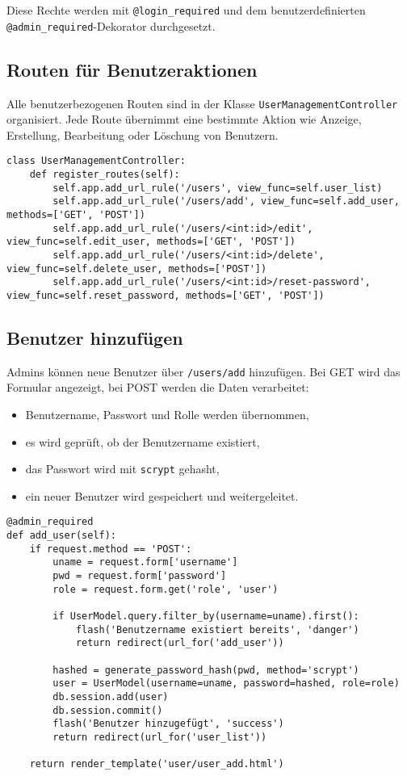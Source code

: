 \documentclass[12pt]{article}
\begin{document}
\noindent Diese Rechte werden mit \texttt{@login\_required} und dem benutzerdefinierten \texttt{@admin\_required}-Dekorator durchgesetzt.

\subsection*{Routen für Benutzeraktionen}

Alle benutzerbezogenen Routen sind in der Klasse \texttt{UserManagementController} organisiert. Jede Route übernimmt eine bestimmte Aktion wie Anzeige, Erstellung, Bearbeitung oder Löschung von Benutzern.

\begin{verbatim}
class UserManagementController:
    def register_routes(self):
        self.app.add_url_rule('/users', view_func=self.user_list)
        self.app.add_url_rule('/users/add', view_func=self.add_user, methods=['GET', 'POST'])
        self.app.add_url_rule('/users/<int:id>/edit', view_func=self.edit_user, methods=['GET', 'POST'])
        self.app.add_url_rule('/users/<int:id>/delete', view_func=self.delete_user, methods=['POST'])
        self.app.add_url_rule('/users/<int:id>/reset-password', view_func=self.reset_password, methods=['GET', 'POST'])
\end{verbatim}

\subsection*{Benutzer hinzufügen}

Admins können neue Benutzer über \texttt{/users/add} hinzufügen. Bei GET wird das Formular angezeigt, bei POST werden die Daten verarbeitet:
\begin{itemize}
  \item Benutzername, Passwort und Rolle werden übernommen,
  \item es wird geprüft, ob der Benutzername existiert,
  \item das Passwort wird mit \texttt{scrypt} gehasht,
  \item ein neuer Benutzer wird gespeichert und weitergeleitet.
\end{itemize}

\begin{verbatim}
@admin_required
def add_user(self):
    if request.method == 'POST':
        uname = request.form['username']
        pwd = request.form['password']
        role = request.form.get('role', 'user')

        if UserModel.query.filter_by(username=uname).first():
            flash('Benutzername existiert bereits', 'danger')
            return redirect(url_for('add_user'))

        hashed = generate_password_hash(pwd, method='scrypt')
        user = UserModel(username=uname, password=hashed, role=role)
        db.session.add(user)
        db.session.commit()
        flash('Benutzer hinzugefügt', 'success')
        return redirect(url_for('user_list'))

    return render_template('user/user_add.html')
\end{verbatim}
\end{document}
